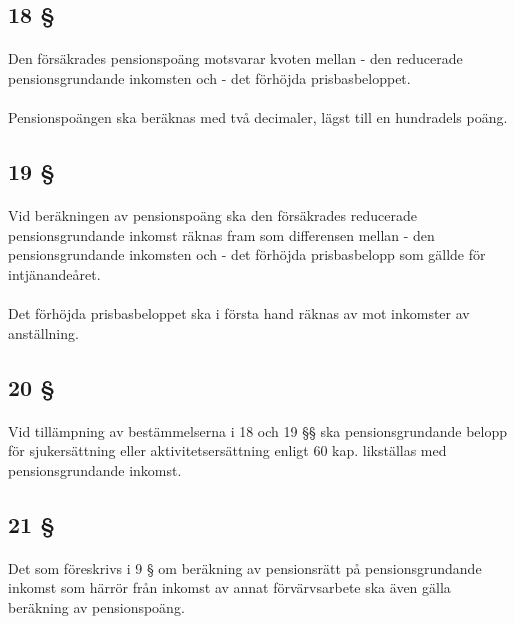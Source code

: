 \documentclass[a4paper,notitlepage,openany,10pt]{book}
\begin{document}
\subsection*{18 §}
\paragraph*{}
Den försäkrades pensionspoäng motsvarar kvoten mellan
\newline - den reducerade pensionsgrundande inkomsten och
\newline - det förhöjda prisbasbeloppet.
\paragraph*{}
Pensionspoängen ska beräknas med två decimaler, lägst till en hundradels poäng.
\subsection*{19 §}
\paragraph*{}
Vid beräkningen av pensionspoäng ska den försäkrades reducerade pensionsgrundande inkomst räknas fram som differensen mellan
\newline - den pensionsgrundande inkomsten och
\newline - det förhöjda prisbasbelopp som gällde för intjänandeåret.
\paragraph*{}
Det förhöjda prisbasbeloppet ska i första hand räknas av mot inkomster av anställning.
\subsection*{20 §}
\paragraph*{}
Vid tillämpning av bestämmelserna i 18 och 19 §§ ska pensionsgrundande belopp för sjukersättning eller aktivitetsersättning enligt 60 kap. likställas med pensionsgrundande inkomst.
\subsection*{21 §}
\paragraph*{}
Det som föreskrivs i 9 § om beräkning av pensionsrätt på pensionsgrundande inkomst som härrör från inkomst av annat förvärvsarbete ska även gälla beräkning av pensionspoäng.
\end{document}

